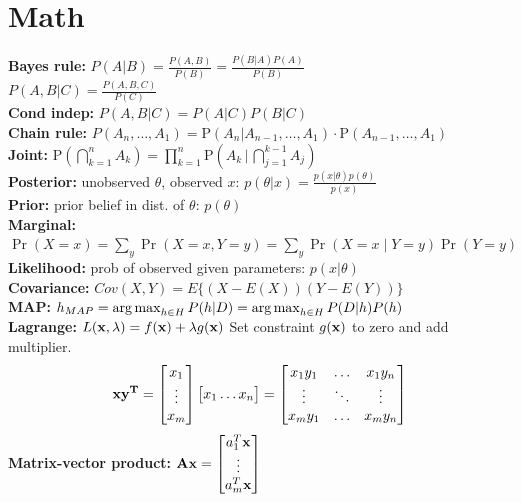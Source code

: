 \section{Math}
{\bf Bayes rule: } $P(A \vert B) = \frac{P(A, B)}{P(B)} = \frac{P(B \vert A) P(A)}{P(B)}$\\
$P(A,B \vert C) = \frac{P(A, B, C)}{P(C)}$ \\
{\bf Cond indep:} $P(A, B \vert C) = P(A \vert C)P(B \vert C)$\\
{\bf Chain rule: } $P(A_n, \ldots , A_1)  = \mathrm P(A_n | A_{n-1}, \ldots , A_1) \cdot\mathrm P( A_{n-1}, \ldots , A_1)$\\
{\bf Joint: } $\mathrm  P\left(\bigcap_{k=1}^n A_k\right)  = \prod_{k=1}^n  \mathrm P\left(A_k \,\Bigg|\, \bigcap_{j=1}^{k-1} A_j\right)$\\
{\bf Posterior:} unobserved $\theta$, observed $x$: $p(\theta \vert x) = \frac{p(x \vert \theta)p(\theta)}{p(x)}$\\
{\bf Prior:} prior belief in dist. of $\theta$: $p(\theta)$\\
{\bf Marginal: } $\Pr(X=x) = \sum_y \Pr(X=x,Y=y) = \sum_y \Pr(X=x\mid Y=y) \Pr(Y=y)$\\
{\bf Likelihood:} prob of observed given parameters: $p(x \vert \theta)$\\
{\bf Covariance:} $Cov(X,Y) = E\{(X - E(X))(Y- E(Y))\}$ \\
{\bf MAP:} $h_{MAP} = \operatorname*{arg\,max}_{h\in H} P(h \vert D) = \operatorname*{arg\,max}_{h\in H} P(D \vert h) P(h)$\\ 
{\bf Lagrange: } $L(\mathbf{x}, \lambda) = f(\mathbf{x}) + \lambda g(\mathbf{x})$
Set constraint $g(\mathbf{x})$ to zero and add multiplier. \\
$$\mathbf{xy^T} = \begin{bmatrix}
           x_{1} \\
           \vdots \\
           x_{m}
         \end{bmatrix}      
         \begin{bmatrix}
           x_{1}\hdots x_{n}
         \end{bmatrix} = \begin{bmatrix}
         x_1 y_1 & \hdots & x_1 y_n \\
         \vdots & \ddots  & \vdots \\
          x_m y_1 & \hdots & x_m y_n \\
         \end{bmatrix}
         $$
{\bf Matrix-vector product: } $ \mathbf{Ax} = \begin{bmatrix}
 	a_1^T\mathbf{x}\\
	\vdots \\
	a_m^T\mathbf{x}
	\end{bmatrix}
$

